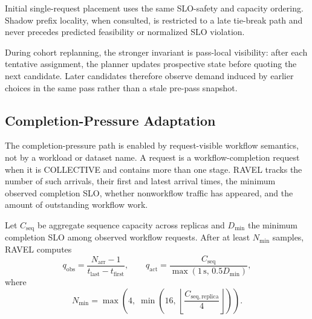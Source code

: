 \documentclass[letterpaper,twocolumn,10pt]{article}
\begin{document}
Initial single-request placement uses the same SLO-safety and capacity
ordering.
Shadow prefix locality, when consulted, is restricted to a late tie-break path
and never precedes predicted feasibility or normalized SLO violation.

During cohort replanning, the stronger invariant is pass-local visibility:
after each tentative assignment, the planner updates prospective state before
quoting the next candidate.
Later candidates therefore observe demand induced by earlier choices in the
same pass rather than a stale pre-pass snapshot.


\subsection{Completion-Pressure Adaptation}
\label{sec:appendix:completion-pressure}

The completion-pressure path is enabled by request-visible workflow semantics,
not by a workload or dataset name.
A request is a workflow-completion request when it is COLLECTIVE and contains
more than one stage.
RAVEL tracks the number of such arrivals, their first and latest arrival
times, the minimum observed completion SLO, whether nonworkflow traffic has
appeared, and the amount of outstanding workflow work.

Let $C_{\mathrm{seq}}$ be aggregate sequence capacity across replicas and
$D_{\min}$ the minimum completion SLO among observed workflow requests.
After at least $N_{\min}$ samples, RAVEL computes
\begin{equation}
    q_{\mathrm{obs}}
    =
    \frac{N_{\mathrm{arr}}-1}
         {t_{\mathrm{last}}-t_{\mathrm{first}}},
    \qquad
    q_{\mathrm{act}}
    =
    \frac{C_{\mathrm{seq}}}
         {\max(1\,\mathrm{s},\,0.5D_{\min})},
    \label{eq:appendix:completion-pressure-qps}
\end{equation}
where
\begin{equation}
    N_{\min}
    =
    \max\!\left(
       4,\;
       \min\!\left(
          16,\,
          \left\lfloor
             \frac{C_{\mathrm{seq,replica}}}{4}
          \right\rfloor
       \right)
    \right).
    \label{eq:appendix:pressure-min-samples}
\end{equation}
\end{document}
